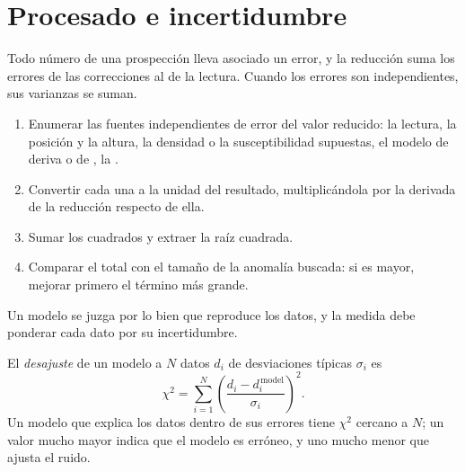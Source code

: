 
\section{Procesado e incertidumbre}\label{sec:b3:field-lab-methods-3:processing}

Todo número de una prospección lleva asociado un error, y la reducción suma los
errores de las correcciones al de la lectura. Cuando los errores son
independientes, sus varianzas se suman.

\begin{method}\label{met:b3:field-lab-methods-3:budget}
\begin{enumerate}
  \item Enumerar las fuentes independientes de error del valor reducido: la
        lectura, la posición y la altura, la densidad o la susceptibilidad
        supuestas, el modelo de deriva o de , la .
  \item Convertir cada una a la unidad del resultado, multiplicándola por la
        derivada de la reducción respecto de ella.
  \item Sumar los cuadrados y extraer la raíz cuadrada.
  \item Comparar el total con el tamaño de la anomalía buscada: si es
        mayor, mejorar primero el término más grande.
\end{enumerate}
\end{method}

Un modelo se juzga por lo bien que reproduce los datos, y la medida
debe ponderar cada dato por su incertidumbre.

\begin{definition}\label{def:b3:field-lab-methods-3:inversion-practice}
El \emph{desajuste} de un modelo a $N$ datos $d_i$ de
desviaciones típicas $\sigma_i$ es
\[
\chi^2 = \sum_{i=1}^N\left(\frac{d_i - d_i^{\,\mathrm{model}}}{\sigma_i}\right)^2 .
\]
Un modelo que explica los datos dentro de sus errores tiene $\chi^2$ cercano
a $N$; un valor mucho mayor indica que el modelo es erróneo, y uno mucho menor
que ajusta el ruido.
\end{definition}

